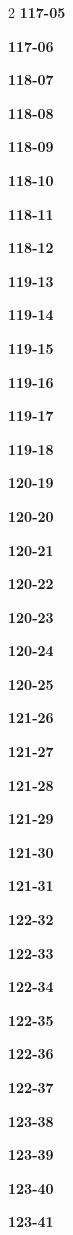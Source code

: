 \documentclass[10pt,a4paper]{article}
\begin{document}
\begin{multicols}{2}
\noindent\textbf{117-05}\ \par
\noindent\textbf{117-06}\ \par
\noindent\textbf{118-07}\ \par
\noindent\textbf{118-08}\ \par
\noindent\textbf{118-09}\ \par
\noindent\textbf{118-10}\ \par
\noindent\textbf{118-11}\ \par
\noindent\textbf{118-12}\ \par
\noindent\textbf{119-13}\ \par
\noindent\textbf{119-14}\ \par
\noindent\textbf{119-15}\ \par
\noindent\textbf{119-16}\ \par
\noindent\textbf{119-17}\ \par
\noindent\textbf{119-18}\ \par
\noindent\textbf{120-19}\ \par
\noindent\textbf{120-20}\ \par
\noindent\textbf{120-21}\ \par
\noindent\textbf{120-22}\ \par
\noindent\textbf{120-23}\ \par
\noindent\textbf{120-24}\ \par
\noindent\textbf{120-25}\ \par
\noindent\textbf{121-26}\ \par
\noindent\textbf{121-27}\ \par
\noindent\textbf{121-28}\ \par
\noindent\textbf{121-29}\ \par
\noindent\textbf{121-30}\ \par
\noindent\textbf{121-31}\ \par
\noindent\textbf{122-32}\ \par
\noindent\textbf{122-33}\ \par
\noindent\textbf{122-34}\ \par
\noindent\textbf{122-35}\ \par
\noindent\textbf{122-36}\ \par
\noindent\textbf{122-37}\ \par
\noindent\textbf{123-38}\ \par
\noindent\textbf{123-39}\ \par
\noindent\textbf{123-40}\ \par
\noindent\textbf{123-41}\ \par

\end{multicols}
\end{document}
